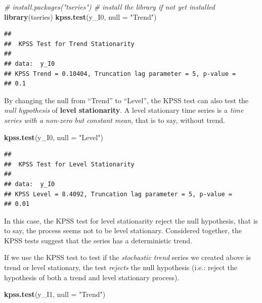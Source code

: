 \documentclass[
]{article}
\newenvironment{Shaded}{\begin{snugshade}}{\end{snugshade}}
\newcommand{\CommentTok}[1]{\textcolor[rgb]{0.56,0.35,0.01}{\textit{#1}}}
\newcommand{\DataTypeTok}[1]{\textcolor[rgb]{0.13,0.29,0.53}{#1}}
\newcommand{\KeywordTok}[1]{\textcolor[rgb]{0.13,0.29,0.53}{\textbf{#1}}}
\newcommand{\NormalTok}[1]{#1}
\newcommand{\StringTok}[1]{\textcolor[rgb]{0.31,0.60,0.02}{#1}}
\begin{document}
\begin{Shaded}
\begin{Highlighting}[]
\CommentTok{# install.packages("tseries") # install the library if not yet installed}
\KeywordTok{library}\NormalTok{(tseries)}
\KeywordTok{kpss.test}\NormalTok{(y_I0, }\DataTypeTok{null =} \StringTok{"Trend"}\NormalTok{)}
\end{Highlighting}
\end{Shaded}

\begin{verbatim}
## 
##  KPSS Test for Trend Stationarity
## 
## data:  y_I0
## KPSS Trend = 0.10404, Truncation lag parameter = 5, p-value =
## 0.1
\end{verbatim}

By changing the null from ``Trend'' to ``Level'', the KPSS test can also test the \emph{null hypothesis} of \textbf{level stationarity}. A level stationary time series is a \emph{time series with a non-zero but constant mean}, that is to say, without trend.

\begin{Shaded}
\begin{Highlighting}[]
\KeywordTok{kpss.test}\NormalTok{(y_I0, }\DataTypeTok{null =} \StringTok{"Level"}\NormalTok{)}
\end{Highlighting}
\end{Shaded}

\begin{verbatim}
## 
##  KPSS Test for Level Stationarity
## 
## data:  y_I0
## KPSS Level = 8.4092, Truncation lag parameter = 5, p-value =
## 0.01
\end{verbatim}

In this case, the KPSS test for level stationarity reject the null hypothesis, that is to say, the process seems not to be level stationary. Considered together, the KPSS tests suggest that the series has a deterministic trend.

If we use the KPSS test to test if the \emph{stochastic trend} series we created above is trend or level stationary, the test \emph{rejects} the null hypothesis (i.e.: reject the hypothesis of both a trend and level stationary process).

\begin{Shaded}
\begin{Highlighting}[]
\KeywordTok{kpss.test}\NormalTok{(y_I1, }\DataTypeTok{null =} \StringTok{"Trend"}\NormalTok{)}
\end{Highlighting}
\end{Shaded}
\end{document}

